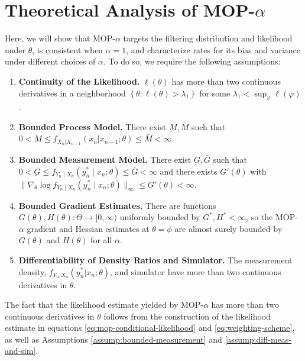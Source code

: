 \documentclass[9pt,twocolumn,pnasresearcharticle]{pnas-new}
\newcommand\arxiv[2]{#2} %
\begin{document}
\arxiv{}{\vspace*{-2mm}}
\section{Theoretical Analysis of MOP-$\alpha$}
\label{sec:thms}

Here, we will show that MOP-$\alpha$ targets the filtering distribution and likelihood under $\theta$, is consistent when $\alpha=1$, and characterize rates for its bias and variance under different choices of $\alpha$. To do so, we require the following assumptions:

\arxiv{}{\vspace*{-2mm}}
\begin{enumerate}[label=(A\arabic*),itemsep=-1.2ex] 
    \item \textbf{Continuity of the Likelihood.} $\ell(\theta)$ has more than two continuous derivatives in a neighborhood $\left\{\theta: \ell(\theta)>\lambda_1\right\}$ for some $\lambda_1<\sup _{\varphi} \ell(\varphi)$. \label{assump:conti-lik}
    \item \textbf{Bounded Process Model.} There exist $\underbar{M}, \bar{M}$ such that $0 < \underbar{M} \leq f_{X_n|X_{n-1}}(x_n | x_{n-1};\theta) \leq \bar{M} < \infty$. \label{assump:bounded-process}
    \item \textbf{Bounded Measurement Model.} There exist $\underbar{G}, \bar{G}$ such that $0<\underbar{G} \leq f_{Y_n \mid X_n}\left(y_n^* \mid x_n; \theta\right) \leq \bar{G}<\infty$ and there exists $G'(\theta)$ with $\|\nabla_\theta \log f_{Y_n \mid X_n}\left(y_n^* \mid x_n; \theta\right)\|_\infty \leq G'(\theta)< \infty$. \label{assump:bounded-measurement}
    \item \textbf{Bounded Gradient Estimates.} There are functions $G(\theta), H(\theta): \Theta \to [0,\infty)$ uniformly bounded by $G^*, H^*<\infty$, so the MOP-$\alpha$ gradient and Hessian estimates at $\theta=\phi$ are almost surely bounded by $G(\theta)$ and $H(\theta)$ for all $\alpha$. \label{assump:local-bounded-derivative}
    \item \textbf{Differentiability of Density Ratios and Simulator.} The measurement density, \arxiv{\\}{}$f_{Y_n|X_n}(y_n^*|x_n; \theta)$, and simulator have more than two continuous derivatives in $\theta$. \label{assump:diff-meas-and-sim}
\end{enumerate}
\arxiv{}{\vspace*{-4mm}}

The fact that the likelihood estimate yielded by MOP-$\alpha$ has more than two continuous derivatives in $\theta$ follows from the construction of the likelihood estimate in equations \ref{eq:mop-conditional-likelihood} and \ref{eq:weighting-scheme}, as well as Assumptions \ref{assump:bounded-measurement} and \ref{assump:diff-meas-and-sim}. 
\end{document}
